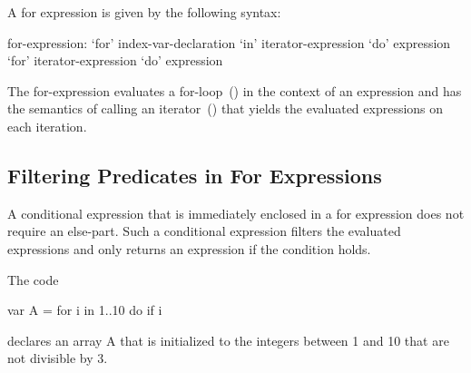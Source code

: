 A for expression is given by the following syntax:
\begin{syntax}
for-expression:
  `for' index-var-declaration `in' iterator-expression `do' expression
  `for' iterator-expression `do' expression
\end{syntax}
The for-expression evaluates a for-loop~() in the
context of an expression and has the semantics of calling an
iterator~() that yields the evaluated expressions on
each iteration.

\subsection{Filtering Predicates in For Expressions}
\label{Filtering_Predicates_For}

A conditional expression that is immediately enclosed in a for
expression does not require an else-part.  Such a conditional
expression filters the evaluated expressions and only returns an
expression if the condition holds.

\begin{example}
The code
\begin{chapel}
var A = for i in 1..10 do if i %
\end{chapel}
declares an array A that is initialized to the integers between
1 and 10 that are not divisible by 3.
\end{example}
